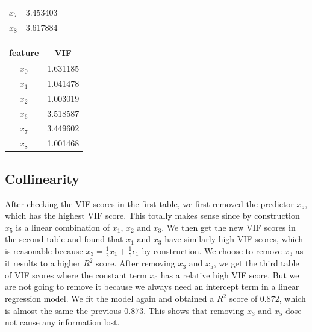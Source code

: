 \documentclass{article}
\begin{document}
\begin{center}
\begin{table}
\begin{tabular}{| c | c |}
       $x_7$ &  3.453403 \\
       $x_8$ &  3.617884 \\
\bottomrule
\end{tabular}
\hfill
\begin{tabular}{|c|c|}
\toprule
 feature &       VIF \\
\midrule
       $x_0$ &  1.631185 \\
       $x_1$ &  1.041478 \\
       $x_2$ &  1.003019 \\
       $x_6$ &  3.518587 \\
       $x_7$ &  3.449602 \\
       $x_8$ &  1.001468 \\
\bottomrule
\end{tabular}
\hfill
\end{table}
\end{center}
\subsection{Collinearity}
After checking the VIF scores in the first table, we first removed the predictor $x_5$, which has the highest VIF score. This totally makes sense since by construction $x_5$ is a linear combination of $x_1$, $x_2$ and $x_3$. We then get the new VIF scores in the second table and found that $x_1$ and $x_3$ have similarly high VIF scores, which is reasonable because $x_3 =\frac 1 2 x_1 + \frac 1 5 \epsilon_1$ by construction. We choose to remove $x_3$ as it results to a higher $R^2$ score. After removing $x_3$ and $x_5$, we get the third table of VIF scores where the constant term $x_0$ has a relative high VIF score. But we are not going to remove it because we always need an intercept term in a linear regression model. We fit the model again and obtained a $R^2$ score of $0.872$, which is almost the same the previous $0.873$. This shows that removing $x_3$ and $x_5$ dose not cause any information lost. 
\end{document}
